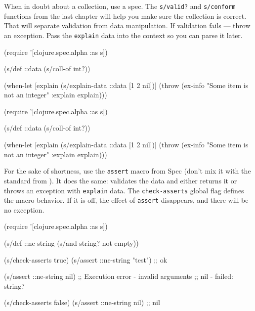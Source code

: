 
When in doubt about a collection, use a spec. The \verb|s/valid?| and \verb|s/conform| functions from the last chapter  will help you make sure the collection is correct. That will separate validation from data manipulation. If validation fails — throw an exception. Pass the \verb|explain| data into the context so you can parse it later.

\ifnarrow

\begin{clojure}
(require '[clojure.spec.alpha :as s])

(s/def ::data (s/coll-of int?))

(when-let [explain (s/explain-data
                     ::data
                     [1 2 nil])]
  (throw (ex-info
           "Some item is not an integer"
           {:explain explain})))
\end{clojure}

\else

\begin{clojure}
(require '[clojure.spec.alpha :as s])

(s/def ::data (s/coll-of int?))

(when-let [explain (s/explain-data ::data [1 2 nil])]
  (throw (ex-info "Some item is not an integer"
                  {:explain explain})))
\end{clojure}

\fi


For the sake of shortness, use the \verb|assert| macro from Spec (don't mix it with the standard  from ). It does the same: validates the data and either returns it or throws an exception with \verb|explain| data. The \verb|check-asserts| global flag defines the macro behavior. If it is off, the effect of \verb|assert| disappears, and there will be no exception.

\ifnarrow

\begin{clojure}
(require '[clojure.spec.alpha :as s])

(s/def ::ne-string
  (s/and string? not-empty))

(s/check-asserts true)
(s/assert ::ne-string "test") ;; ok

(s/assert ::ne-string nil)
;; Execution error - invalid arguments
;; nil - failed: string?

(s/check-asserts false)
(s/assert ::ne-string nil) ;; nil
\end{clojure}


